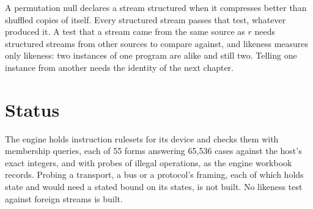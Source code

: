 A permutation null declares a stream structured when it compresses better than shuffled copies of itself. Every structured stream passes that test, whatever produced it. A test that a stream came from the same source as \(r\) needs structured streams from other sources to compare against, and likeness measures only likeness: two instances of one program are alike and still two. Telling one instance from another needs the identity of the next chapter.

\section{\texorpdfstring{Status}{Status}}

The engine holds instruction rulesets for its device and checks them with membership queries, each of 55 forms answering 65,536 cases against the host's exact integers, and with probes of illegal operations, as the engine workbook~\cite{src:Quigg-engine-workbook} records. Probing a transport, a bus or a protocol's framing, each of which holds state and would need a stated bound on its states, is not built. No likeness test against foreign streams is built.
